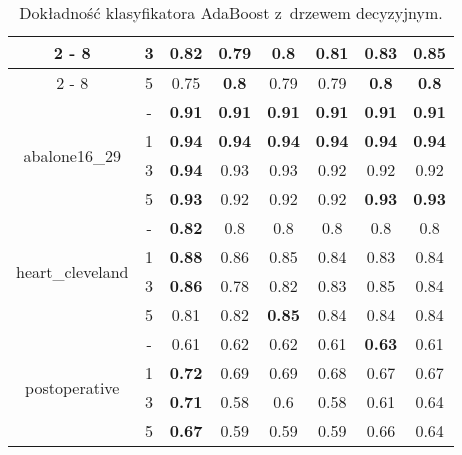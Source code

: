 \begin{table}[H]
\begin{center}
{\begin{tabular}{c|c|cccccc}
\cline{2%
	-%
	8}%
&3&0.82&0.79&0.8&0.81&0.83&\textbf{0.85}\\%
\cline{2%
	-%
	8}%
&5&0.75&\textbf{0.8}&0.79&0.79&\textbf{0.8}&\textbf{0.8}\\%
\hline%
\multirow{4}{*}{abalone16\_29}&{-}&\textbf{0.91}&\textbf{0.91}&\textbf{0.91}&\textbf{0.91}&\textbf{0.91}&\textbf{0.91}\\%
\cline{2%
	-%
	8}%
&1&\textbf{0.94}&\textbf{0.94}&\textbf{0.94}&\textbf{0.94}&\textbf{0.94}&\textbf{0.94}\\%
\cline{2%
	-%
	8}%
&3&\textbf{0.94}&0.93&0.93&0.92&0.92&0.92\\%
\cline{2%
	-%
	8}%
&5&\textbf{0.93}&0.92&0.92&0.92&\textbf{0.93}&\textbf{0.93}\\%
\hline%
\multirow{4}{*}{heart\_cleveland}&{-}&\textbf{0.82}&0.8&0.8&0.8&0.8&0.8\\%
\cline{2%
	-%
	8}%
&1&\textbf{0.88}&0.86&0.85&0.84&0.83&0.84\\%
\cline{2%
	-%
	8}%
&3&\textbf{0.86}&0.78&0.82&0.83&0.85&0.84\\%
\cline{2%
	-%
	8}%
&5&0.81&0.82&\textbf{0.85}&0.84&0.84&0.84\\%
\hline%
\multirow{4}{*}{postoperative}&{-}&0.61&0.62&0.62&0.61&\textbf{0.63}&0.61\\%
\cline{2%
	-%
	8}%
&1&\textbf{0.72}&0.69&0.69&0.68&0.67&0.67\\%
\cline{2%
	-%
	8}%
&3&\textbf{0.71}&0.58&0.6&0.58&0.61&0.64\\%
\cline{2%
	-%
	8}%
&5&\textbf{0.67}&0.59&0.59&0.59&0.66&0.64\\%
\hline%
\end{tabular}}
			\caption{Dokładność klasyfikatora AdaBoost z~drzewem decyzyjnym.}
			\label{adaboostdrzewo}
		\end{center}
\end{table}
